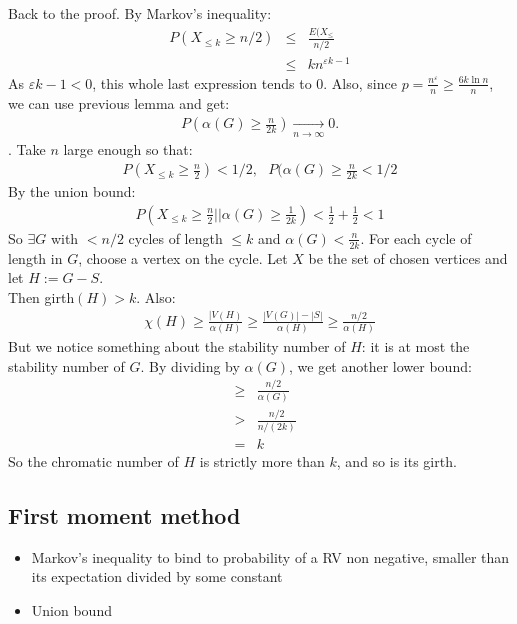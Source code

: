 		
Back to the proof. By Markov's inequality:
\begin{eqnarray}
	P(X_{\leq k} \geq n/2) &\leq& \frac{E(X_{\leq}}{n/2} \\
	&\leq& k n^{\varepsilon k-1}
\end{eqnarray}
As $\varepsilon k-1 <0$, this whole last expression tends to 0. Also, since $p = \frac{n^\varepsilon}{n} \geq \frac{6k \ln n}{n}$, we can use previous lemma and get:
\begin{eqnarray}
	P(\alpha(G) \geq \frac{n}{2k}) \underset{n \rightarrow \infty}{\rightarrow} 0.
\end{eqnarray}.
Take $n$ large enough so that:
\begin{eqnarray}
	P(X_{\leq k} \geq \frac{n}{2}) < 1/2, ~~~
	P(\alpha(G) \geq \frac{n}{2k} < 1/2
\end{eqnarray}
By the union bound:
\begin{eqnarray}
	P(X_{\leq k} \geq \frac{n}{2} || \alpha(G) \geq \frac{1}{2k}) < \frac{1}{2} + \frac{1}{2} < 1
\end{eqnarray}
So $\exists G$ with $<n/2$ cycles of length $\leq k$ and $\alpha(G) < \frac{n}{2k}$. For each cycle of length in $G$, choose a vertex on the cycle. Let $X$ be the set of chosen vertices and let $H := G - S$.\\

Then girth$(H) > k$. Also:
\begin{eqnarray}
	\chi(H) \geq \frac{|V(H)}{\alpha(H)} \geq \frac{|V(G)| - |S|}{\alpha(H)} \geq \frac{n/2}{\alpha(H)}
\end{eqnarray} 
But we notice something about the stability number of $H$: it is at most the stability number of $G$. By dividing by $\alpha(G)$, we get another lower bound:
\begin{eqnarray}
	&\geq& \frac{n/2}{\alpha(G)}\\
	&>& \frac{n/2}{n/(2k)} \\
	&=& k
\end{eqnarray}
So the chromatic number of $H$ is strictly more than $k$, and so is its girth.

\subsection{First moment method} 
\begin{itemize}
	\item Markov's inequality to bind to probability of a RV non negative, smaller than its expectation divided by some constant
	\item Union bound	
\end{itemize}


